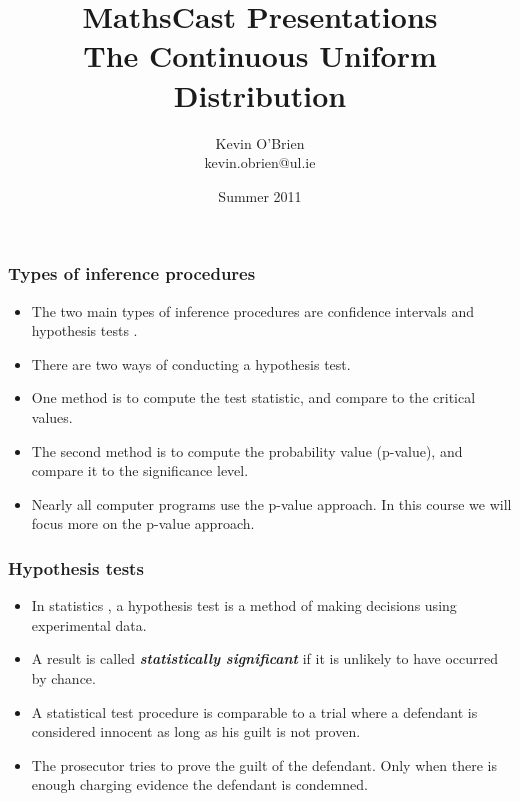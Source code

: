 ﻿\documentclass[a4]{beamer}
\title[MathsCast]{MathsCast Presentations \\ {\normalsize The Continuous Uniform Distribution}}
\author[Kevin O'Brien]{Kevin O'Brien \\ {\scriptsize kevin.obrien@ul.ie}}
\date{Summer 2011}
\institute[Maths \& Stats]{Dept. of Mathematics \& Statistics, \\ University \textit{of} Limerick}
\begin{document}






\begin{frame}
\frametitle{Types of inference procedures}
\large
\begin{itemize}
\item The two main types of inference procedures are confidence intervals and hypothesis tests .\item There are two ways of conducting a hypothesis test.\item  One method is to compute the test statistic, and compare to the critical values.\item The second method is to compute the probability value (p-value), and compare it to the significance level.\item Nearly all computer programs use the p-value approach. In this course we will focus more on the p-value approach.
\end{itemize}
\end{frame}


\begin{frame}
\frametitle{Hypothesis tests}
\large
\begin{itemize} \item
In statistics , a  hypothesis test is a method of making decisions using experimental data. \item A result is called \textbf{\emph{statistically significant}} if it is unlikely to have occurred by chance. \item A statistical test procedure is comparable to a trial where a defendant is considered innocent as long as his guilt is not proven.\item  The prosecutor tries to prove the guilt of the defendant. Only when there is enough charging evidence the defendant is condemned.
\end{itemize}

\end{frame}
\end{document}
